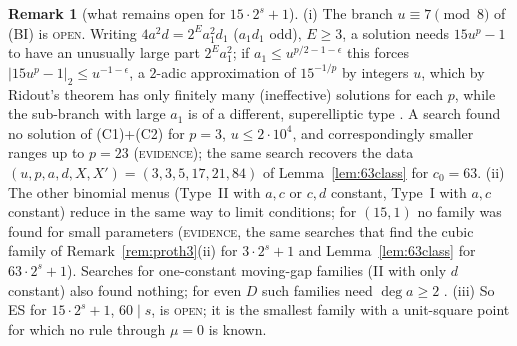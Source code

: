 \documentclass[11pt,reqno]{amsart}
\theoremstyle{definition}
\newtheorem{remark}[theorem]{Remark}
\newcommand{\status}[1]{\textup{\textsc{#1}}}
\begin{document}
\begin{remark}[what remains open for $15\cdot2^s+1$]\label{rem:15open}
(i) The branch $u\equiv7\pmod8$ of (BI) is \status{open}.  Writing
$4a^2d=2^Ea_1^2d_1$ ($a_1d_1$ odd), $E\ge3$, a solution needs $15u^p-1$ to
have an unusually large part $2^Ea_1^2$; if $a_1\le u^{p/2-1-\epsilon}$ this
forces $|15u^p-1|_2\le u^{-1-\epsilon}$, a $2$-adic approximation of
$15^{-1/p}$ by integers $u$, which by Ridout's theorem has only finitely
many (ineffective) solutions for each $p$,%
 while the sub-branch with large $a_1$ is of a different,
superelliptic type \cite[\S2.4]{Exp15}.  A search found no solution of
(C1)+(C2) for $p=3$, $u\le2\cdot10^4$, and correspondingly smaller ranges up
to $p=23$ (\status{evidence}); the same search recovers the data
$(u,p,a,d,X,X')=(3,3,5,17,21,84)$ of Lemma~\ref{lem:63class} for $c_0=63$.
(ii) The other binomial menus (Type~II with $a,c$ or $c,d$ constant, Type~I
with $a,c$ constant) reduce in the same way to limit conditions; for
$(15,1)$ no family was found for small parameters (\status{evidence}, the
same searches that find the cubic family of Remark~\ref{rem:proth3}(ii) for
$3\cdot2^s+1$ and Lemma~\ref{lem:63class} for $63\cdot2^s+1$).  Searches for
one-constant moving-gap families (II with only $d$ constant) also found
nothing; for even $D$ such families need $\deg a\ge2$
\cite[Lemma~3.1]{Exp15}.  (iii) So ES for $15\cdot2^s+1$, $60\mid s$, is
\status{open}; it is the smallest family with a unit-square point for which
no rule through $\mu=0$ is known.
\end{remark}
\end{document}
